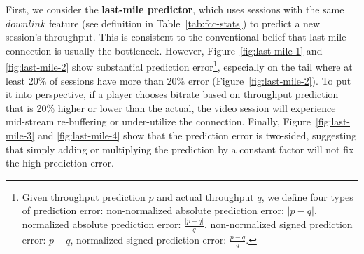\begin{packeditemize}
\item First, we consider the {\bf last-mile predictor}, which uses sessions with the same $\mathit{downlink}$ feature (see definition in Table~\ref{tab:fcc-stats}) to predict a new session's throughput.  This is consistent to the conventional belief that last-mile connection is usually the bottleneck. However, Figure~\ref{fig:last-mile-1} and \ref{fig:last-mile-2} show substantial prediction error\footnote{Given throughput prediction $p$ and actual throughput $q$, we define four types of prediction error: non-normalized absolute prediction error: $|p-q|$, normalized absolute prediction error: $\frac{|p-q|}{q}$, non-normalized signed prediction error: $p-q$, normalized signed prediction error: $\frac{p-q}{q}$.}, especially on the tail where at least 20\% of sessions have more than 20\% error (Figure~\ref{fig:last-mile-2}). To put it into perspective, if a player chooses bitrate based on throughput prediction that is 20\% higher or lower than the actual, the video session will experience mid-stream re-buffering or under-utilize the connection. Finally, Figure~\ref{fig:last-mile-3} and \ref{fig:last-mile-4} show that the prediction error is two-sided, suggesting that simply adding or multiplying the prediction by a constant factor will not fix the high prediction error.





\end{packeditemize}
